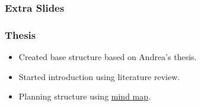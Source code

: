 \begin{frame}
    \frametitle{Extra Slides}
\end{frame}

{
    \begin{frame}[plain]
    \end{frame}
}

{
    \begin{frame}[plain]
    \end{frame}
}

{
    \begin{frame}[plain]
    \end{frame}
}

{
    \begin{frame}[plain]
    \end{frame}
}

\begin{frame}
    \frametitle{Thesis} 
    \vspace{-1cm}
    \begin{itemize}
        \item Created base structure based on Andrea's thesis. \vspace{1cm}
        \item Started introduction using literature review. \vspace{1cm}
        \item Planning structure using \href{run:/local/home/coates/Documents/LaTeX/Thesis/PhD_Thesis.mm}{mind map}.
    \end{itemize}
\end{frame} 
